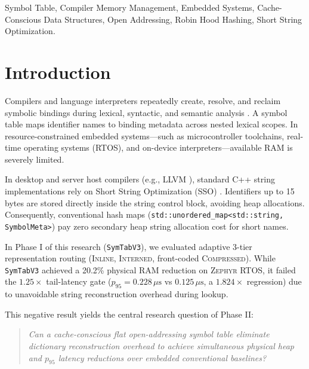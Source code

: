 \documentclass[conference]{IEEEtran}
\begin{document}
\begin{IEEEkeywords}
Symbol Table, Compiler Memory Management, Embedded Systems, Cache-Conscious Data Structures, Open Addressing, Robin Hood Hashing, Short String Optimization.
\end{IEEEkeywords}

\section{Introduction}
Compilers and language interpreters repeatedly create, resolve, and reclaim symbolic bindings during lexical, syntactic, and semantic analysis \cite{aho}. A symbol table maps identifier names to binding metadata across nested lexical scopes. In resource-constrained embedded systems---such as microcontroller toolchains, real-time operating systems (RTOS), and on-device interpreters---available RAM is severely limited.

In desktop and server host compilers (e.g., LLVM \cite{lattner2004llvm}), standard C++ string implementations rely on Short String Optimization (SSO) \cite{meyers2001effective, sutter2004exceptional}. Identifiers up to 15 bytes are stored directly inside the string control block, avoiding heap allocations. Consequently, conventional hash maps (\texttt{std::unordered\_map<std::string, SymbolMeta>}) pay zero secondary heap string allocation cost for short names.

In Phase I of this research (\texttt{SymTabV3}), we evaluated adaptive 3-tier representation routing (\textsc{Inline}, \textsc{Interned}, front-coded \textsc{Compressed}). While \texttt{SymTabV3} achieved a 20.2\% physical RAM reduction on \textsc{Zephyr} RTOS, it failed the $1.25\times$ tail-latency gate ($p_{95} = 0.228\,\mu\text{s}$ vs $0.125\,\mu\text{s}$, a $1.824\times$ regression) due to unavoidable string reconstruction overhead during lookup.

This negative result yields the central research question of Phase II:
\begin{quote}
\emph{Can a cache-conscious flat open-addressing symbol table eliminate dictionary reconstruction overhead to achieve simultaneous physical heap and $p_{95}$ latency reductions over embedded conventional baselines?}
\end{quote}
\end{document}
